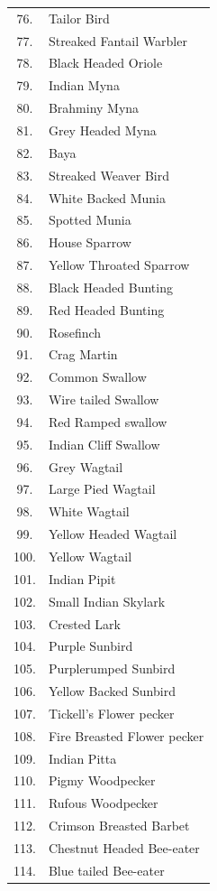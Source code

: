 {\begin{longtable}{cl}
76.	& Tailor Bird \\
77.	& Streaked Fantail Warbler \\
78.	& Black Headed Oriole \\
79.	& Indian Myna \\
80.	& Brahminy Myna \\
81.	& Grey Headed Myna\\ 
82.	& Baya \\
83.	& Streaked Weaver Bird \\
84.	& White Backed Munia \\
85.	& Spotted Munia \\
86.	& House Sparrow \\
87.	& Yellow Throated Sparrow \\
88.	& Black Headed Bunting \\
89.	& Red Headed Bunting \\
90.	& Rosefinch \\
91.	& Crag Martin \\
92.	& Common Swallow \\
93.	& Wire tailed Swallow \\
94.	& Red Ramped swallow \\
95.	& Indian Cliff Swallow \\
96.	& Grey Wagtail \\
97.	& Large Pied Wagtail \\
98.	& White Wagtail \\  
99. & Yellow Headed Wagtail \\
100.&	Yellow Wagtail \\
101.&	Indian Pipit \\
102.&	Small Indian Skylark \\
103.&	Crested Lark \\
104.&	Purple Sunbird \\
105.&	Purplerumped Sunbird \\
106.&	Yellow Backed Sunbird \\
107.&	Tickell's Flower pecker\\ 
108.&	Fire Breasted Flower pecker \\
109.&	Indian Pitta \\
110.&	Pigmy Woodpecker \\
111.	&Rufous Woodpecker \\
112.	&Crimson Breasted Barbet \\
113.	&Chestnut Headed Bee-eater \\
114.	&Blue tailed Bee-eater \\

\end{longtable}}
